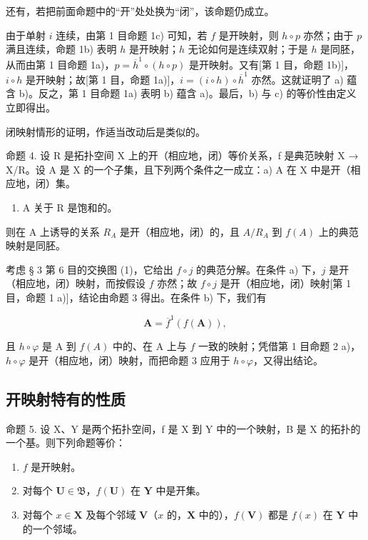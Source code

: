 还有，若把前面命题中的“开”处处换为“闭”，该命题仍成立。

由于单射 \(i\) 连续，由第 1 目命题 1c) 可知，若 \(f\) 是开映射，则 \(h \circ p\) 亦然；由于 \(p\) 满且连续，命题 1b) 表明 \(h\) 是开映射；\(h\) 无论如何是连续双射；于是 \(h\) 是同胚，从而由第 1 目命题 1a)，\(p = \overline{h}^1 \circ (h \circ p)\) 是开映射。又有{[}第 1 目，命题 1b){]}，\(i \circ h\) 是开映射；故{[}第 1 目，命题 1a){]}，\(i = (i \circ h) \circ \overline{h}^1\) 亦然。这就证明了 a) 蕴含 b)。反之，第 1 目命题 1a) 表明 b) 蕴含 a)。最后，b) 与 c) 的等价性由定义立即得出。

闭映射情形的证明，作适当改动后是类似的。

命题 4. 设 R 是拓扑空间 X 上的开（相应地，闭）等价关系，f 是典范映射 X → X/R。设 A 是 X 的一个子集，且下列两个条件之一成立：a) A 在 X 中是开（相应地，闭）集。

\begin{enumerate}
\def\labelenumi{\alph{enumi})}
\setcounter{enumi}{1}
\tightlist
\item
  A 关于 R 是饱和的。
\end{enumerate}

则在 A 上诱导的关系 \(R_{A}\) 是开（相应地，闭）的，且 \(A/R_{A}\) 到 \(f(A)\) 上的典范映射是同胚。

考虑 § 3 第 6 目的交换图 (1)，它给出 \(f \circ j\) 的典范分解。在条件 a) 下，\(j\) 是开（相应地，闭）映射，而按假设 \(f\) 亦然；故 \(f \circ j\) 是开（相应地，闭）映射{[}第 1 目，命题 1 a){]}，结论由命题 3 得出。在条件 b) 下，我们有

\[
\mathbf {A} = \overline {{{f}}} ^ {1} (f (\mathbf {A})),
\]

且 \(h \circ \varphi\) 是 A 到 \(f(A)\) 中的、在 A 上与 \(f\) 一致的映射；凭借第 1 目命题 2 a)，\(h \circ \varphi\) 是开（相应地，闭）映射，而把命题 3 应用于 \(h \circ \varphi\)，又得出结论。

\subsection{开映射特有的性质}

命题 5. 设 X、Y 是两个拓扑空间，f 是 X 到 Y 中的一个映射，B 是 X 的拓扑的一个基。则下列命题等价：

\begin{enumerate}
\def\labelenumi{\alph{enumi})}
\item
  \(f\) 是开映射。
\item
  对每个 \(\mathbf{U} \in \mathfrak{B}\)，\(f(\mathbf{U})\) 在 \(\mathbf{Y}\) 中是开集。
\item
  对每个 \(x \in \mathbf{X}\) 及每个邻域 \(\mathbf{V}\)（\(x\) 的，\(\mathbf{X}\) 中的），\(f(\mathbf{V})\) 都是 \(f(x)\) 在 \(\mathbf{Y}\) 中的一个邻域。
\end{enumerate}

